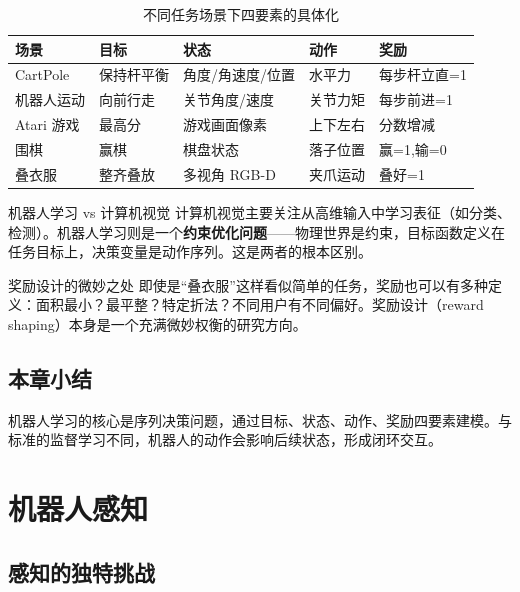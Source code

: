 \documentclass[a4paper]{article}
\begin{document}
\begin{table}[H]
\centering
\begin{tabular}{lllll}
\toprule
\textbf{场景} & \textbf{目标} & \textbf{状态} & \textbf{动作} & \textbf{奖励} \\
\midrule
CartPole & 保持杆平衡 & 角度/角速度/位置 & 水平力 & 每步杆立直=1 \\
机器人运动 & 向前行走 & 关节角度/速度 & 关节力矩 & 每步前进=1 \\
Atari 游戏 & 最高分 & 游戏画面像素 & 上下左右 & 分数增减 \\
围棋 & 赢棋 & 棋盘状态 & 落子位置 & 赢=1,输=0 \\
叠衣服 & 整齐叠放 & 多视角 RGB-D & 夹爪运动 & 叠好=1 \\
\bottomrule
\end{tabular}
\caption{不同任务场景下四要素的具体化}
\end{table}

\begin{knowledgebox}{机器人学习 vs 计算机视觉}
计算机视觉主要关注从高维输入中学习表征（如分类、检测）。机器人学习则是一个\textbf{约束优化问题}——物理世界是约束，目标函数定义在任务目标上，决策变量是动作序列。这是两者的根本区别。
\end{knowledgebox}

\begin{warningbox}{奖励设计的微妙之处}
即使是``叠衣服''这样看似简单的任务，奖励也可以有多种定义：面积最小？最平整？特定折法？不同用户有不同偏好。奖励设计（reward shaping）本身是一个充满微妙权衡的研究方向。
\end{warningbox}

\subsection{本章小结}

机器人学习的核心是序列决策问题，通过目标、状态、动作、奖励四要素建模。与标准的监督学习不同，机器人的动作会影响后续状态，形成闭环交互。


\section{机器人感知}

\subsection{感知的独特挑战}
\end{document}
